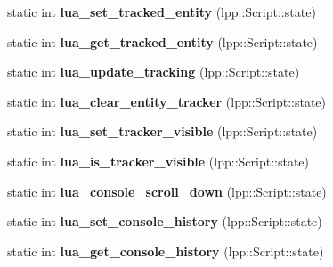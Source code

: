 \begin{DoxyCompactItemize}
\item 
static int {\bfseries lua\+\_\+set\+\_\+tracked\+\_\+entity} (lpp\+::\+Script\+::state)\hypertarget{class_lua_interface_a54666f50dfd34d1b1c6a51bee6343daa}{}\label{class_lua_interface_a54666f50dfd34d1b1c6a51bee6343daa}

\item 
static int {\bfseries lua\+\_\+get\+\_\+tracked\+\_\+entity} (lpp\+::\+Script\+::state)\hypertarget{class_lua_interface_a9b9891a38ec0bc0503cebe1f2e333f8a}{}\label{class_lua_interface_a9b9891a38ec0bc0503cebe1f2e333f8a}

\item 
static int {\bfseries lua\+\_\+update\+\_\+tracking} (lpp\+::\+Script\+::state)\hypertarget{class_lua_interface_a7a08f92bf41456af480dcdb6019e8f74}{}\label{class_lua_interface_a7a08f92bf41456af480dcdb6019e8f74}

\item 
static int {\bfseries lua\+\_\+clear\+\_\+entity\+\_\+tracker} (lpp\+::\+Script\+::state)\hypertarget{class_lua_interface_af4c95492902e26014fe780d09a70869a}{}\label{class_lua_interface_af4c95492902e26014fe780d09a70869a}

\item 
static int {\bfseries lua\+\_\+set\+\_\+tracker\+\_\+visible} (lpp\+::\+Script\+::state)\hypertarget{class_lua_interface_aa19b4d1c37c8e3d9d723301c030de2e5}{}\label{class_lua_interface_aa19b4d1c37c8e3d9d723301c030de2e5}

\item 
static int {\bfseries lua\+\_\+is\+\_\+tracker\+\_\+visible} (lpp\+::\+Script\+::state)\hypertarget{class_lua_interface_a44a0828abb73105cf860d908d7427624}{}\label{class_lua_interface_a44a0828abb73105cf860d908d7427624}

\item 
static int {\bfseries lua\+\_\+console\+\_\+scroll\+\_\+down} (lpp\+::\+Script\+::state)\hypertarget{class_lua_interface_a7b8dd4cc95bab4352fcc425794deb3f2}{}\label{class_lua_interface_a7b8dd4cc95bab4352fcc425794deb3f2}

\item 
static int {\bfseries lua\+\_\+set\+\_\+console\+\_\+history} (lpp\+::\+Script\+::state)\hypertarget{class_lua_interface_afda3df01ed4314003f230750f2b431b1}{}\label{class_lua_interface_afda3df01ed4314003f230750f2b431b1}

\item 
static int {\bfseries lua\+\_\+get\+\_\+console\+\_\+history} (lpp\+::\+Script\+::state)\hypertarget{class_lua_interface_a5f6814864b53bd95d20f35a599d3793c}{}\label{class_lua_interface_a5f6814864b53bd95d20f35a599d3793c}


\end{DoxyCompactItemize}
